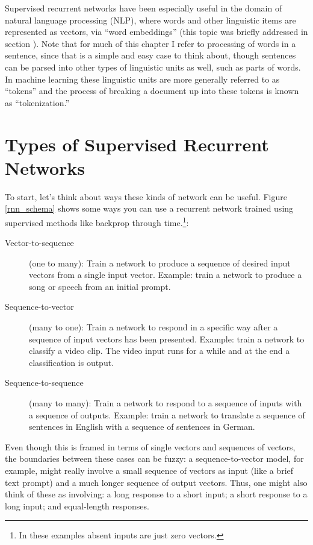 Supervised recurrent networks have been especially useful in the domain of natural language processing (NLP), where words and other linguistic items are represented as vectors, via ``word embeddings'' (this topic was briefly addressed in section ). Note that  for much of this chapter I refer to processing of words in a sentence, since that is a simple and easy case to think about, though sentences can be parsed into other types of linguistic units as well, such as parts of words. In machine learning these linguistic units are more generally referred to as ``tokens'' and the process of breaking a document up into these tokens is known as ``tokenization.''
	
\section{Types of Supervised Recurrent Networks}

To start, let's think about ways these kinds of network can be useful. Figure \ref{rnn_schema} shows some ways you can use a recurrent network trained using supervised methods like backprop through time.\footnote{In these examples absent inputs are just zero vectors.}:
\begin{description}
\item[Vector-to-sequence] (one to many):  Train a network to produce a sequence of desired input vectors from a single input vector. Example: train a network to produce a song or speech from an initial prompt.
\item[Sequence-to-vector] (many to one): Train a network to respond in a specific way after a sequence of input vectors has been presented. Example: train a network to classify a video clip. The video input runs for a while and at the end a classification is output.
\item[Sequence-to-sequence] (many to many): Train a network to respond to a sequence of inputs with a sequence of outputs. Example: train a network to translate a sequence of sentences in English with a sequence of sentences in German.
\end{description}
Even though this is framed in terms of single vectors and sequences of vectors, the boundaries between these cases can be fuzzy: a sequence-to-vector model, for example, might really involve a small sequence of vectors as input (like a brief text prompt) and a much longer sequence of output vectors. Thus, one might also think of these as involving: a long response to a short input; a short response to a long input; and equal-length responses.

